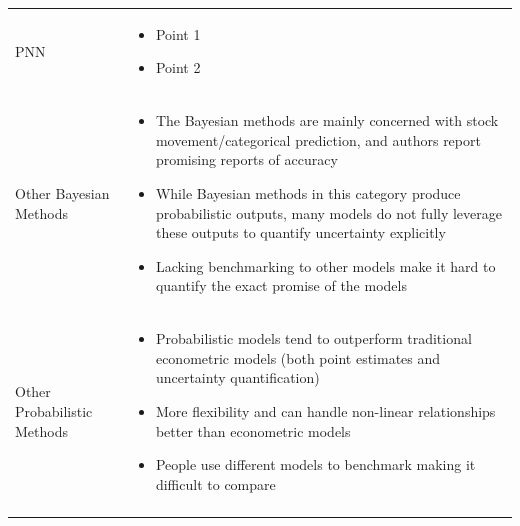 \begin{table}[ht!]
\begin{adjustbox}{width=1\textwidth,center}
\begin{tabular}{p{}p{}}
        \addlinespace
        \hdashline[0.2pt/3pt]
        \addlinespace
        PNN & 
        \begin{itemize}[left=0pt]
        \vspace{-4mm}
            \item Point 1
            \item Point 2
        \end{itemize}\\
        \addlinespace
        \hdashline[0.2pt/3pt]
        \addlinespace
        Other Bayesian Methods & 
        \vspace{-4mm}
        \begin{itemize}[left=0pt]
            \item The Bayesian methods are mainly concerned with stock movement/categorical prediction, and authors report promising reports of accuracy
            \item While Bayesian methods in this category produce probabilistic outputs, many models do not fully leverage these outputs to quantify uncertainty explicitly
            \item Lacking benchmarking to other models make it hard to quantify the exact promise of the models
        \end{itemize}\\
        \hdashline[0.2pt/3pt]
        \addlinespace
        Other Probabilistic Methods & 
        \vspace{-4mm}
        \begin{itemize}[left=0pt]
            \item Probabilistic models tend to outperform traditional econometric models (both point estimates and uncertainty quantification)
            \item More flexibility and can handle non-linear relationships better than econometric models
            \item People use different models to benchmark making it difficult to compare
        \end{itemize} \\
        \addlinespace
        \addlinespace
        \bottomrule
    \end{tabular}
    \end{adjustbox}
\end{table}





